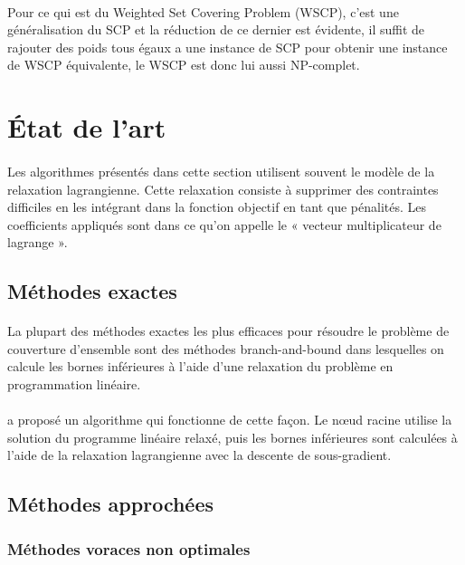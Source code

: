 \documentclass[12pt,letterpaper,twoside]{article}
\begin{document}
		\paragraph*{}
			Pour ce qui est du Weighted Set Covering Problem (WSCP), c'est une généralisation du SCP et la réduction de ce dernier est évidente, il suffit de rajouter des poids tous égaux a une instance de SCP pour obtenir une instance de WSCP équivalente, le WSCP est donc lui aussi NP-complet.
	\section{État de l'art}
		\paragraph*{}
			Les algorithmes présentés dans cette section utilisent souvent le modèle de la relaxation lagrangienne.
			Cette relaxation consiste à supprimer des contraintes difficiles en les intégrant dans la fonction objectif en tant que pénalités.
			Les coefficients appliqués sont dans ce qu'on appelle le « vecteur multiplicateur de lagrange ».~\cite{fisher1985applications}
		\subsection{Méthodes exactes}
			\paragraph*{}
				La plupart des méthodes exactes les plus efficaces pour résoudre le problème de couverture d'ensemble sont
				des méthodes branch-and-bound
				dans lesquelles on calcule les bornes inférieures à l'aide d'une relaxation du problème en programmation
				linéaire.~\cite{caprara2000algorithms}
			\paragraph*{}
				\citeauthor{Beasley1987} a proposé un algorithme qui fonctionne de cette façon.
				Le nœud racine utilise la solution du programme linéaire relaxé, puis les bornes inférieures
				sont calculées à l'aide de la relaxation lagrangienne avec la descente de sous-gradient.~\cite{Beasley1987}
		\subsection{Méthodes approchées}
			\subsubsection{Méthodes voraces non optimales}\label{sec:soa-greedy}
\end{document}
